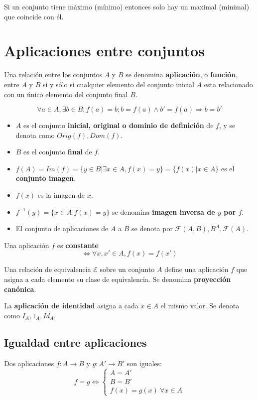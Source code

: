 Si un conjunto tiene máximo (mínimo) entonces solo hay un maximal (minimal) que coincide con él.

\section{Aplicaciones entre conjuntos}

Una relación entre los conjuntos $A$ y $B$ se denomina \textbf{aplicación}, o \textbf{función}, entre $A$ y $B$ si y sólo si cualquier elemento del conjunto inicial $A$ esta relacionado con un único elemento del conjunto final $B$.

\[
\forall a \in A, \exists b \in B; f(a)=b; b=f(a) \wedge b'=f(a) \Rightarrow b=b'
\]

\begin{itemize}
\item $A$ es el conjunto \textbf{inicial, original o dominio de definición} de $f$, y se denota como $Orig(f), Dom(f)$.
\item $B$ es el conjunto \textbf{final} de $f$.
\item $f(A)=Im(f)=\{y \in B|\exists x \in A, f(x)=y\}=\{f(x)| x \in A\}$ es el \textbf{conjunto imagen}.
\item $f(x)$ es la imagen de $x$.
\item $f^{-1}(y)=\{x \in A | f(x)=y\}$ se denomina \textbf{imagen inversa de $y$ por $f$}.
\item El conjunto de aplicaciones de $A$ a $B$ se denota por $\mathcal{F}(A,B),B^A,\mathcal{F}(A)$.
\end{itemize}

Una aplicación $f$ es \textbf{constante}
\[
\Leftrightarrow \forall x,x' \in A, f(x)=f(x')
\] 

Una relación de equivalencia $\mathcal{E}$ sobre un conjunto $A$ define una aplicación $f$ que asigna a cada elemento su clase de equivalencia. Se denomina \textbf{proyección canónica}.

La \textbf{aplicación de identidad} asigna a cada $x \in A$ el mismo valor. Se denota como $I_A,1_A,Id_A$.

\subsection{Igualdad entre aplicaciones}

Dos aplicaciones $f: A \longrightarrow B$ y $g: A' \longrightarrow B'$ son iguales:
\[
f=g \Leftrightarrow \begin{cases}
A=A'\\
B=B'\\
f(x)=g(x)\ \forall x \in A
\end{cases}
\]

